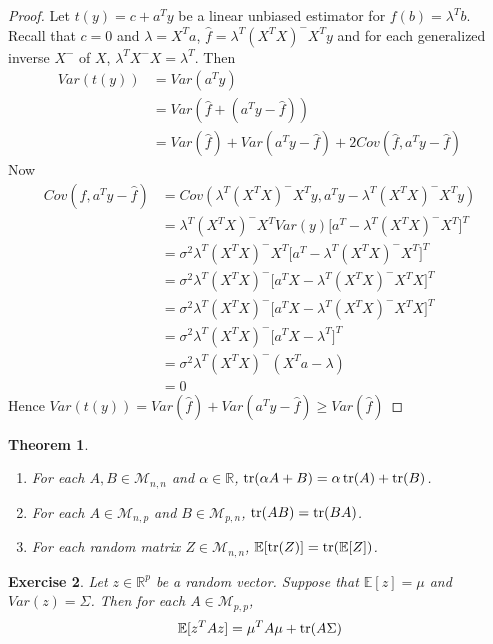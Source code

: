 \documentclass[12pt]{amsart}
\newtheorem{thm}{Theorem}[section]
\newtheorem{ex}[thm]{Exercise}
\newcommand{\al}{\alpha}
\newcommand{\lam}{\lambda}
\newcommand{\sig}{\sigma}
\newcommand{\Sig}{\Sigma}
\newcommand{\E}{\mathbb{E}}
\newcommand{\R}{\mathbb{R}}
\newcommand{\MM}{\mathcal{M}}
\begin{document}
\begin{proof}
Let $t(y) = c+ a^Ty$ be a linear unbiased estimator for $f(b) = \lam^Tb$. Recall that $c = 0$ and $\lam = X^Ta$, $\hat{f} = \lam^T (X^TX)^-X^Ty$ and for each generalized inverse $X^-$ of $X$, $\lam^TX^-X = \lam^T$. Then 
\begin{align*}
Var(t(y)) 
&= Var(a^Ty) \\
&= Var(\hat{f} + (a^Ty - \hat{f})) \\
&= Var(\hat{f}) + Var(a^Ty - \hat{f}) + 2Cov(\hat{f}, a^Ty - \hat{f}) 
\end{align*}
Now \begin{align*}
Cov(\hat{f}, a^Ty - \hat{f})
&= Cov(\lam^T (X^TX)^-X^Ty, a^Ty - \lam^T (X^TX)^-X^Ty) \\
&= \lam^T (X^TX)^-X^TVar(y)\bigg[a^T - \lam^T (X^TX)^-X^T \bigg]^T \\
&= \sig^2 \lam^T (X^TX)^-X^T\bigg[a^T - \lam^T (X^TX)^-X^T \bigg]^T \\
&=\sig^2 \lam^T (X^TX)^-\bigg[a^TX - \lam^T (X^TX)^-X^TX \bigg]^T \\
&= \sig^2 \lam^T (X^TX)^-\bigg[a^TX - \lam^T (X^TX)^-X^TX \bigg]^T \\
&= \sig^2 \lam^T (X^TX)^-\bigg[a^TX - \lam^T \bigg]^T \\
&= \sig^2 \lam^T (X^TX)^-(X^Ta - \lam) \\
&= 0
\end{align*}
Hence $Var(t(y)) = Var(\hat{f}) + Var(a^Ty - \hat{f}) \geq Var(\hat{f})$
\end{proof}

\begin{thm}\
\begin{enumerate}
\item For each $A,B \in \MM_{n,n}$ and $\al \in \R$, $\trace(\al A+B) = \al \trace(A) + \trace(B)$.
\item For each $A \in \MM_{n,p}$ and $B \in \MM_{p,n}$, $\trace(AB) = \trace(BA)$.
\item For each random matrix $Z \in \MM_{n,n}$, $\E[\trace(Z)] = \trace(\E[Z])$.
\end{enumerate} 
\end{thm}

\begin{ex}
Let $z \in \R^p$ be a random vector. Suppose that $\E[z] = \mu$ and $Var(z) = \Sigma$. Then for each $A \in \MM_{p,p}$, $$\E[z^TAz] = \mu^T A \mu + \trace(A\Sig)$$
\end{ex}
\end{document}
